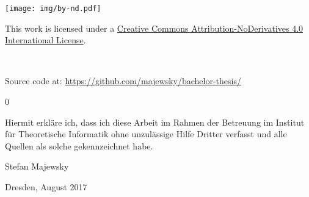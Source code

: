 \documentclass[
 paper=A4,pagesize=automedia,fontsize=11pt,
 BCOR=10mm,DIV=16,
 twoside,headinclude,footinclude=false,
 bibtotocnumbered,          %
 liststotoc,                %
 listsleft,
 pointlessnumbers,          %
 cleardoublepage=empty      %
]{scrbook}
\newcounter{theorem}
\theoremstyle{definition}
\numberwithin{theorem}{chapter}
\numberwithin{equation}{chapter}
\numberwithin{figure}{chapter}
\numberwithin{table}{chapter}
\begin{document}
\begin{titlepage}
 \vspace*{5em}
 \begin{singlespace}
  \hspace{0.18\linewidth}
  \begin{minipage}{0.1\linewidth}
   \texttt{[image: img/by-nd.pdf]}
  \end{minipage}
  \hspace{0.02\linewidth}
  \begin{minipage}{0.6\linewidth}\footnotesize\flushleft
   This work is licensed under a \href{https://creativecommons.org/licenses/by-nd/4.0/}{Creative Commons Attribution-NoDerivatives 4.0 International License}.
  \end{minipage}\\[-1em]
  \begin{center}\footnotesize
   Source code at: \url{https://github.com/majewsky/bachelor-thesis/}
  \end{center}
 \end{singlespace}
\end{titlepage}

\cleardoublepage
\tableofcontents
\mainmatter





\appendix{}
\renewcommand\thesection{\Alph{section}}
\renewcommand\theequation{\Alph{section}.\arabic{equation}}
\renewcommand\thefigure{\Alph{section}.\arabic{figure}}
\renewcommand\thetable{\Alph{section}.\arabic{table}}
\setcounter{theorem}0
\renewcommand\thetheorem{\Alph{section}.\arabic{theorem}}



\backmatter



\clearpage
\thispagestyle{empty}

\vspace*{1.5em}

Hiermit erkläre ich, dass ich diese Arbeit im Rahmen der Betreuung im Institut
für Theoretische Informatik ohne unzulässige Hilfe Dritter verfasst und alle
Quellen als solche gekennzeichnet habe.

\vspace*{15em}

Stefan Majewsky \par
Dresden, {\color{red}August 2017} %
\end{document}
